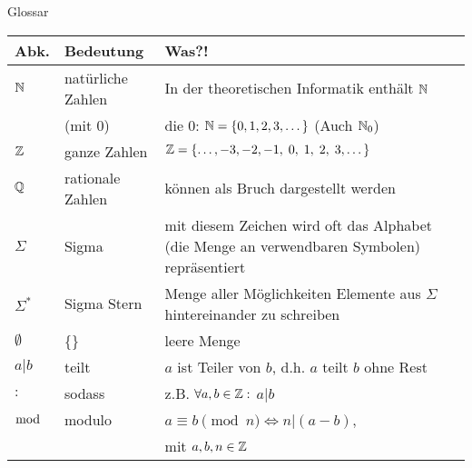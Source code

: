 %
%
%
%

\begin{frame}[fragile]{Glossar}
	\small
	\begin{tabular}{p{} p{} p{}}
		\toprule
		Abk.&Bedeutung&Was?!\\
		\midrule
		$\mathbb{N}$&natürliche Zahlen&In der theoretischen Informatik enthält $\mathbb{N}$ \\ 
		&(mit 0)&die 0: $\mathbb{N}=\{0,1,2,3,\dots\}$ (Auch $\mathbb{N}_0$)\\
		$\mathbb{Z}$&ganze Zahlen& $\mathbb{Z}=\{\dots,-3,-2,-1,\;0,\;1,\;2,\;3,\dots\}$\\
		$\mathbb{Q}$&rationale Zahlen&können als Bruch dargestellt werden\\
		$\Sigma$ & Sigma& mit diesem Zeichen wird oft das Alphabet (die Menge an verwendbaren Symbolen) repräsentiert\\
		$\Sigma^\ast$&Sigma Stern&Menge aller Möglichkeiten Elemente aus $\Sigma$ hintereinander zu schreiben\\
		$\emptyset$&\{\}&leere Menge\\
		$a|b$&teilt& $a$ ist Teiler von $b$, d.h. $a$ teilt $b$ ohne Rest\\
		$:$&sodass&z.B. $\forall a,b\in\mathbb{Z}:$ $a|b$\\
		$\bmod$&modulo& $a\equiv b \pmod n \iff n|(a-b)$,\\
		&& mit $a,b,n\in\mathbb{Z}$\\
		\bottomrule
	\end{tabular}
\end{frame}